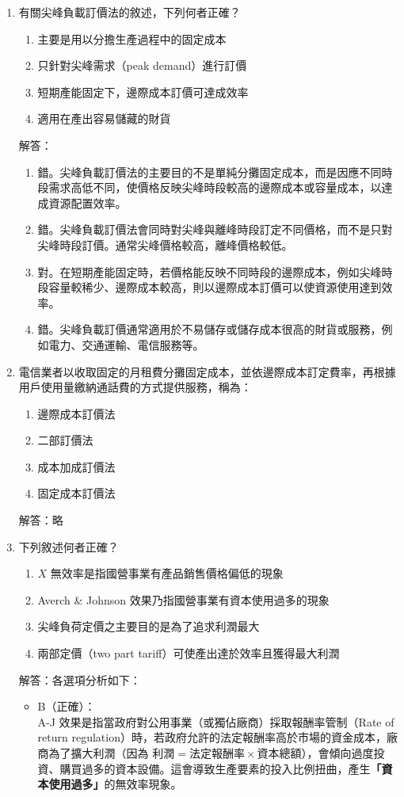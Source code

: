 \documentclass[12pt, a4paper]{article}
\begin{document}
\begin{enumerate}
    \item 有關尖峰負載訂價法的敘述，下列何者正確？
    \begin{enumerate}[label=\Alph*.]
        \item 主要是用以分擔生產過程中的固定成本
        \item 只針對尖峰需求（peak demand）進行訂價
        \item 短期產能固定下，邊際成本訂價可達成效率
        \item 適用在產出容易儲藏的財貨
    \end{enumerate}
    解答：
    \begin{enumerate}[label=\Alph*.]
        \item 錯。尖峰負載訂價法的主要目的不是單純分攤固定成本，而是因應不同時段需求高低不同，使價格反映尖峰時段較高的邊際成本或容量成本，以達成資源配置效率。
        \item 錯。尖峰負載訂價法會同時對尖峰與離峰時段訂定不同價格，而不是只對尖峰時段訂價。通常尖峰價格較高，離峰價格較低。
        \item 對。在短期產能固定時，若價格能反映不同時段的邊際成本，例如尖峰時段容量較稀少、邊際成本較高，則以邊際成本訂價可以使資源使用達到效率。
        \item 錯。尖峰負載訂價通常適用於不易儲存或儲存成本很高的財貨或服務，例如電力、交通運輸、電信服務等。
    \end{enumerate}

    \item 電信業者以收取固定的月租費分攤固定成本，並依邊際成本訂定費率，再根據用戶使用量繳納通話費的方式提供服務，稱為：
    \begin{enumerate}[label=\Alph*.]
        \item 邊際成本訂價法
        \item 二部訂價法
        \item 成本加成訂價法
        \item 固定成本訂價法
    \end{enumerate}
    解答：略

    \item 下列敘述何者正確？
    \begin{enumerate}[label=\Alph*.]
        \item \(X\) 無效率是指國營事業有產品銷售價格偏低的現象
        \item Averch \& Johnson 效果乃指國營事業有資本使用過多的現象
        \item 尖峰負荷定價之主要目的是為了追求利潤最大
        \item 兩部定價（two part tariff）可使產出達於效率且獲得最大利潤
    \end{enumerate}
    解答：各選項分析如下：
    \begin{itemize}
        \item B（正確）： \\
        A-J 效果是指當政府對公用事業（或獨佔廠商）採取報酬率管制（Rate of return regulation）時，若政府允許的法定報酬率高於市場的資金成本，廠商為了擴大利潤（因為 \(\text{利潤} = \text{法定報酬率} \times \text{資本總額}\)），會傾向過度投資、購買過多的資本設備。這會導致生產要素的投入比例扭曲，產生\textbf{「資本使用過多」}的無效率現象。


\end{itemize}
\end{enumerate}
\end{document}
